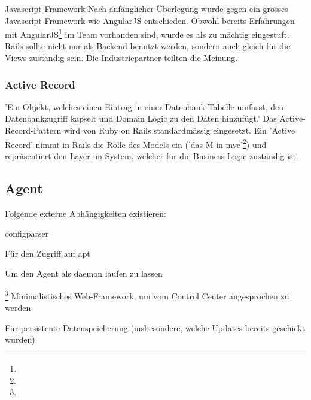 \begin{decision}{Javascript-Framework}
Nach anfänglicher Überlegung wurde gegen ein grosses Javascript-Framework wie AngularJS entschieden. Obwohl bereits Erfahrungen mit AngularJS\footnote{} im Team vorhanden sind, wurde es als zu mächtig eingestuft. Rails sollte nicht nur als Backend benutzt werden, sondern auch gleich für die Views zuständig sein. Die Industriepartner teilten die Meinung. 
\end{decision}

\subsubsection*{Active Record}

'Ein Objekt, welches einen Eintrag in einer Datenbank-Tabelle umfasst, den Datenbankzugriff kapselt und Domain Logic zu den Daten hinzufügt.'
Das Active-Record-Pattern wird von Ruby on Rails standardmässig eingesetzt. Ein 'Active Record' nimmt in Rails die Rolle des Models ein ('das M in \gls{mvc}'\footnote{}) und repräsentiert den Layer im System, welcher für die Business Logic zuständig ist.


\subsection*{Agent}

\xxx

Folgende externe Abhängigkeiten existieren:

\begin{labeling}{configparser}
    \item [apt] Für den Zugriff auf \gls{apt}
    \item [daemonize] Um den Agent als \gls{daemon} laufen zu lassen
    \item [configparser]
    \item [bottle]\footnote{} Minimalistisches Web-Framework, um vom Control Center angesprochen zu werden
    \item [shelve] Für persistente Datenspeicherung (insbesondere, welche Updates bereits geschickt wurden)
\end{labeling}

